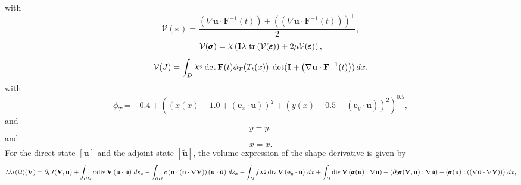 \documentclass[preview]{standalone}
\let\oldcdot\cdot
\let\cdot\oldcdot
\begin{document}
with
\begin{dmath*}
\mathcal V(\pmb \varepsilon) = \frac{\left(  \nabla {\mathbf{ u }}  \cdot  \mathbf F^{-1}(t) \right) +  \left( \left(  \nabla {\mathbf{ u }}  \cdot  \mathbf F^{-1}(t) \right) \right)^\top }{2},
 \end{dmath*}
\begin{dmath*}
\mathcal V(\pmb \sigma) = \raisebox{\depth}{$\chi$} \left(\mathbf{I} \lambda  \,\operatorname{tr}\left(\mathcal V(\pmb \varepsilon)\right)  + 2 \mu \mathcal V(\pmb \varepsilon)\right),
 \end{dmath*}
\begin{dmath*}
\mathcal V(J) =  \int_{D} \raisebox{\depth}{$\chi_2$}  \operatorname{det}\mathbf F( t )  \phi_{T}(T_t(x))  \;\operatorname{det}(\mathbf{I} + \left(  \nabla {\mathbf{ u }}  \cdot  \mathbf F^{-1}(t) \right))  \,dx.
 \end{dmath*}
with 
\begin{dmath*}
\phi_{T} = -0.4 + \left(\left(x(x) - 1.0 + \left( \mathbf e_x \cdot {\mathbf{ u }} \right)\right)^{2} + \left(y(x) - 0.5 + \left( \mathbf e_y \cdot {\mathbf{ u }} \right)\right)^{2}\right)^{0.5},\end{dmath*}
and\begin{dmath*}
y = y,\end{dmath*}
and\begin{dmath*}
x = x.\end{dmath*}
For the direct state $\left[ {\mathbf{ u }}\right]$ and the adjoint state $\left[ \tilde{\mathbf{ u }}\right]$, the volume expression of the shape derivative is given by
\begin{dmath*}
DJ(\Omega)(\mathbf V) = \partial_{t} J({\mathbf V},{\mathbf{ u }}) +  \int_{\partial D} c \operatorname{div} {\mathbf V} \left( {\mathbf{ u }} \cdot \tilde{\mathbf{ u }} \right) \,ds_x -  \int_{\partial D} c \left( \mathbf n \cdot \left( \mathbf n \cdot  \nabla {\mathbf V}  \right) \right) \left( {\mathbf{ u }} \cdot \tilde{\mathbf{ u }} \right) \,ds_x -  \int_{D} f \raisebox{\depth}{$\chi_2$} \operatorname{div} {\mathbf V} \left( \mathbf e_y \cdot \tilde{\mathbf{ u }} \right) \,dx +  \int_{D} \operatorname{div} {\mathbf V} \left( \pmb \sigma({\mathbf{ u }}) \mathrel{:}  \nabla \tilde{\mathbf{ u }}  \right) + \left( \partial_{t} \pmb \sigma({\mathbf V},{\mathbf{ u }}) \mathrel{:}  \nabla \tilde{\mathbf{ u }}  \right) - \left( \pmb \sigma({\mathbf{ u }}) \mathrel{:} \left( \left(  \nabla \tilde{\mathbf{ u }}  \cdot  \nabla {\mathbf V}  \right) \right)\right) \,dx , 
\end{dmath*}
\end{document}
